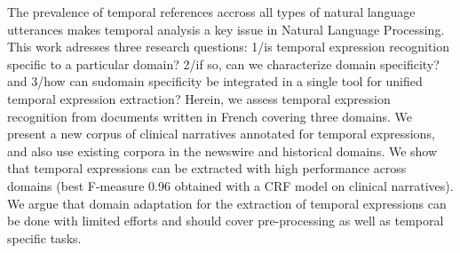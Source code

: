 The prevalence of temporal references accross all types of natural language utterances makes temporal analysis a key issue in Natural Language Processing. This work adresses three research questions: 1/is temporal expression recognition specific to a particular domain? 2/if so, can we characterize domain specificity? and 3/how can sudomain  specificity be integrated in a single tool for unified temporal expression extraction? Herein, we assess temporal expression recognition from documents written in French covering three domains. We present a new corpus of clinical narratives annotated for temporal expressions, and also use existing corpora in the newswire and historical domains. We show that temporal expressions can be extracted with high performance across domains (best F-measure 0.96 obtained with a CRF model on clinical narratives). We argue that domain adaptation for the extraction of temporal expressions can be done with limited efforts and should cover pre-processing as well as temporal specific tasks.
